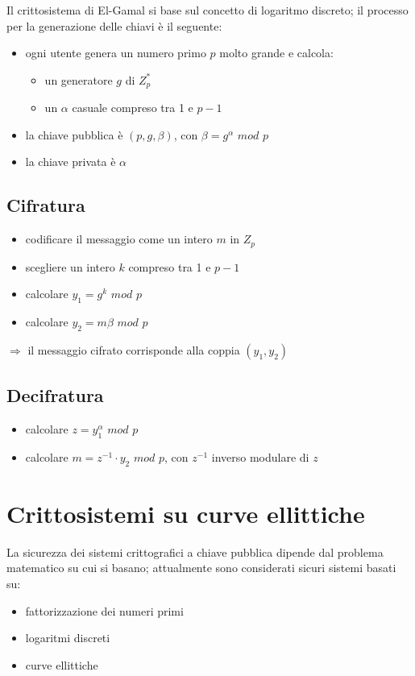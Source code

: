Il crittosistema di El-Gamal si base sul concetto di logaritmo discreto; il processo per 
la generazione delle chiavi è il seguente:
\begin{itemize}
    \item ogni utente genera un numero primo $p$ molto grande e calcola:
    \begin{itemize}
        \item un generatore $g$ di $Z_p^*$
        \item un $\alpha$ casuale compreso tra 1 e $p-1$
    \end{itemize}
    \item la chiave pubblica è $(p, g, \beta)$, con $\beta = g^\alpha$ $mod$ $p$
    \item la chiave privata è $\alpha$
\end{itemize}

\subsection{Cifratura}

\begin{itemize}
    \item codificare il messaggio come un intero $m$ in $Z_p$
    \item scegliere un intero $k$ compreso tra 1 e $p-1$
    \item calcolare $y_1 = g^k$ $mod$ $p$
    \item calcolare $y_2 = m\beta$ $mod$ $p$
\end{itemize}

$\Rightarrow$ il messaggio cifrato corrisponde alla coppia $(y_1, y_2)$

\subsection{Decifratura}
\begin{itemize}
    \item calcolare $z=y_1^\alpha$ $mod$ $p$
    \item calcolare $m = z^{-1} \cdot y_2$ $mod$ $p$, con $z^{-1}$ inverso modulare di $z$
\end{itemize}


\section{Crittosistemi su curve ellittiche}

La sicurezza dei sistemi crittografici a chiave pubblica dipende dal problema matematico 
su cui si basano; attualmente sono considerati sicuri sistemi basati su:
\begin{itemize}
    \item fattorizzazione dei numeri primi 
    \item logaritmi discreti 
    \item curve ellittiche
\end{itemize}

